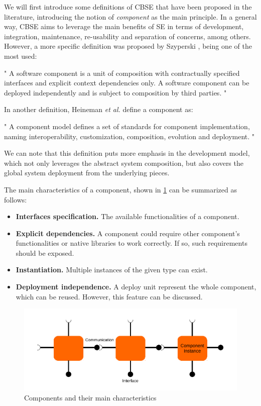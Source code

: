 We will first introduce some definitions of CBSE that have been proposed in the literature, introducing the notion of \textit{component} as the main principle.
In a general way, CBSE aims to leverage the main benefits of SE in terms of development, integration, maintenance, re-usability and separation of concerns, among others.
However, a more specific definition was proposed by Szyperski \cite{szyperski2002component}, being one of the most used:
\begin{citeverbatim}
	" A software component is a unit of composition with contractually specified interfaces and explicit context dependencies only. A software component can be deployed independently and is subject to composition by third parties. "
\end{citeverbatim}
In another definition, Heineman \textit{et al.} \cite{heineman2001cbse} define a component as:
\begin{citeverbatim}
	" A component model defines a set of standards for component implementation, naming interoperability, customization, composition, evolution and deployment. "
\end{citeverbatim}
We can note that this definition puts more emphasis in the development model, which not only leverages the abstract system composition, but also covers the global system deployment from the underlying pieces.

The main characteristics of a component, shown in \ref{fig:CBSE} can be summarized as follows:
\begin{itemize}
	\item \textbf{Interfaces specification.} The available functionalities of a component.
	\item \textbf{Explicit dependencies.} A component could require other component's functionalities or native libraries to work correctly.
	If so, such requirements should be exposed.
	\item \textbf{Instantiation.} Multiple instances of the given type can exist.
	\item \textbf{Deployment independence.} A deploy unit represent the whole component, which can be reused. However, this feature can be discussed.
\end{itemize}

\begin{figure}[htb]
	\centering
	\includegraphics[width=1\columnwidth]{chapters/stateOfTheArt.images/CBSE.pdf}
	\caption{Components and their main characteristics}
	\label{fig:CBSE}
\end{figure}

